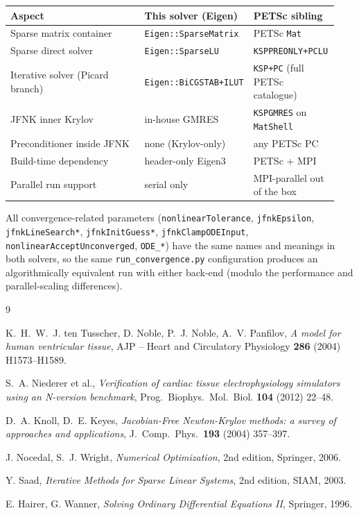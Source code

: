 \documentclass[11pt,a4paper]{article}
\newcommand{\code}[1]{\texttt{\small #1}}
\begin{document}
\begin{center}
\begin{tabular}{@{}p{0.42\linewidth}p{0.26\linewidth}p{0.26\linewidth}@{}}
\toprule
Aspect & This solver (Eigen) & PETSc sibling \\
\midrule
Sparse matrix container & \code{Eigen::SparseMatrix} & PETSc \code{Mat} \\
Sparse direct solver & \code{Eigen::SparseLU} & \code{KSPPREONLY+PCLU} \\
Iterative solver (Picard branch) & \code{Eigen::BiCGSTAB+ILUT} &
    \code{KSP+PC} (full PETSc catalogue) \\
JFNK inner Krylov & in-house GMRES & \code{KSPGMRES} on \code{MatShell} \\
Preconditioner inside JFNK & none (Krylov-only) & any PETSc PC \\
Build-time dependency & header-only Eigen3 &
    PETSc + MPI \\
Parallel run support & serial only & MPI-parallel out of the box \\
\bottomrule
\end{tabular}
\end{center}

All convergence-related parameters (\code{nonlinearTolerance},
\code{jfnkEpsilon}, \code{jfnkLineSearch*}, \code{jfnkInitGuess*},
\code{jfnkClampODEInput}, \code{nonlinearAcceptUnconverged},
\code{ODE\_*}) have the same names and meanings in both solvers, so
the same \code{run\_convergence.py} configuration produces an
algorithmically equivalent run with either back-end (modulo the
performance and parallel-scaling differences).

\begin{thebibliography}{9}

 K.~H.~W.~J. ten Tusscher, D. Noble, P.~J. Noble, A.~V.
    Panfilov, \emph{A model for human ventricular tissue},
    AJP -- Heart and Circulatory Physiology
    \textbf{286} (2004) H1573--H1589.

 S.~A. Niederer et al.,
    \emph{Verification of cardiac tissue electrophysiology simulators
    using an N-version benchmark}, Prog.\ Biophys.\ Mol.\ Biol.
    \textbf{104} (2012) 22--48.

 D.~A. Knoll, D.~E. Keyes,
    \emph{Jacobian-Free Newton-Krylov methods: a survey of approaches
    and applications}, J.\ Comp.\ Phys.\ \textbf{193}
    (2004) 357--397.

 J. Nocedal, S.~J. Wright,
    \emph{Numerical Optimization}, 2nd edition, Springer, 2006.

 Y. Saad,
    \emph{Iterative Methods for Sparse Linear Systems}, 2nd edition,
    SIAM, 2003.

 E. Hairer, G. Wanner,
    \emph{Solving Ordinary Differential Equations II}, Springer, 1996.

\end{thebibliography}
\end{document}
